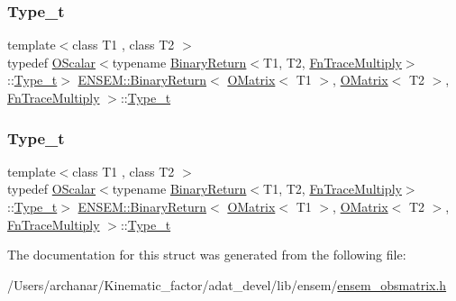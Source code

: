 \subsubsection{\texorpdfstring{Type\_t}{Type\_t}\hspace{0.1cm}{\footnotesize\ttfamily [1/2]}}
{\footnotesize\ttfamily template$<$class T1 , class T2 $>$ \\
typedef \mbox{\hyperlink{classENSEM_1_1OScalar}{O\+Scalar}}$<$typename \mbox{\hyperlink{structENSEM_1_1BinaryReturn}{Binary\+Return}}$<$T1, T2, \mbox{\hyperlink{structENSEM_1_1FnTraceMultiply}{Fn\+Trace\+Multiply}}$>$\+::\mbox{\hyperlink{structENSEM_1_1BinaryReturn_3_01OMatrix_3_01T1_01_4_00_01OMatrix_3_01T2_01_4_00_01FnTraceMultiply_01_4_a1064f843fb99598f8501245bce56e77f}{Type\+\_\+t}}$>$ \mbox{\hyperlink{structENSEM_1_1BinaryReturn}{E\+N\+S\+E\+M\+::\+Binary\+Return}}$<$ \mbox{\hyperlink{classENSEM_1_1OMatrix}{O\+Matrix}}$<$ T1 $>$, \mbox{\hyperlink{classENSEM_1_1OMatrix}{O\+Matrix}}$<$ T2 $>$, \mbox{\hyperlink{structENSEM_1_1FnTraceMultiply}{Fn\+Trace\+Multiply}} $>$\+::\mbox{\hyperlink{structENSEM_1_1BinaryReturn_3_01OMatrix_3_01T1_01_4_00_01OMatrix_3_01T2_01_4_00_01FnTraceMultiply_01_4_a1064f843fb99598f8501245bce56e77f}{Type\+\_\+t}}}

\mbox{\label{structENSEM_1_1BinaryReturn_3_01OMatrix_3_01T1_01_4_00_01OMatrix_3_01T2_01_4_00_01FnTraceMultiply_01_4_a1064f843fb99598f8501245bce56e77f}} 
\subsubsection{\texorpdfstring{Type\_t}{Type\_t}\hspace{0.1cm}{\footnotesize\ttfamily [2/2]}}
{\footnotesize\ttfamily template$<$class T1 , class T2 $>$ \\
typedef \mbox{\hyperlink{classENSEM_1_1OScalar}{O\+Scalar}}$<$typename \mbox{\hyperlink{structENSEM_1_1BinaryReturn}{Binary\+Return}}$<$T1, T2, \mbox{\hyperlink{structENSEM_1_1FnTraceMultiply}{Fn\+Trace\+Multiply}}$>$\+::\mbox{\hyperlink{structENSEM_1_1BinaryReturn_3_01OMatrix_3_01T1_01_4_00_01OMatrix_3_01T2_01_4_00_01FnTraceMultiply_01_4_a1064f843fb99598f8501245bce56e77f}{Type\+\_\+t}}$>$ \mbox{\hyperlink{structENSEM_1_1BinaryReturn}{E\+N\+S\+E\+M\+::\+Binary\+Return}}$<$ \mbox{\hyperlink{classENSEM_1_1OMatrix}{O\+Matrix}}$<$ T1 $>$, \mbox{\hyperlink{classENSEM_1_1OMatrix}{O\+Matrix}}$<$ T2 $>$, \mbox{\hyperlink{structENSEM_1_1FnTraceMultiply}{Fn\+Trace\+Multiply}} $>$\+::\mbox{\hyperlink{structENSEM_1_1BinaryReturn_3_01OMatrix_3_01T1_01_4_00_01OMatrix_3_01T2_01_4_00_01FnTraceMultiply_01_4_a1064f843fb99598f8501245bce56e77f}{Type\+\_\+t}}}



The documentation for this struct was generated from the following file\+:\begin{DoxyCompactItemize}
\item 
/\+Users/archanar/\+Kinematic\+\_\+factor/adat\+\_\+devel/lib/ensem/\mbox{\hyperlink{lib_2ensem_2ensem__obsmatrix_8h}{ensem\+\_\+obsmatrix.\+h}}\end{DoxyCompactItemize}
